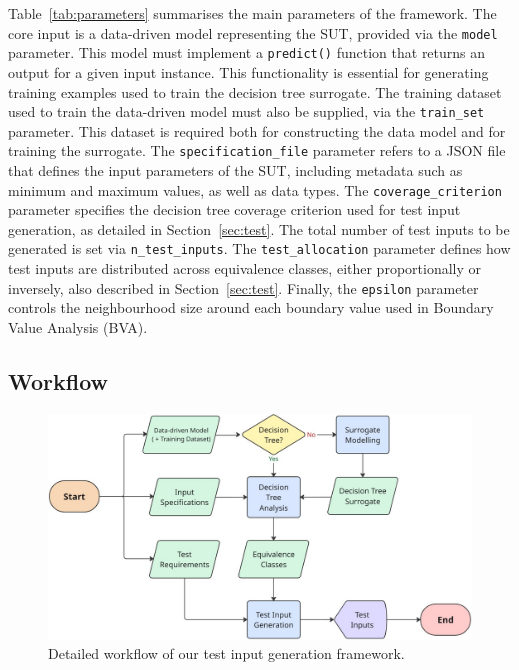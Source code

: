 \documentclass[
]{ceurart}
\theoremstyle{definition}
\begin{document}
Table~\ref{tab:parameters} summarises the main parameters of the framework. The core input is a data-driven model representing the SUT, provided via the \lstinline{model} parameter. This model must implement a \lstinline{predict()} function that returns an output for a given input instance. This functionality is essential for generating training examples used to train the decision tree surrogate. The training dataset used to train the data-driven model must also be supplied, via the \lstinline{train_set} parameter. This dataset is required both for constructing the data model and for training the surrogate. The \lstinline{specification_file} parameter refers to a JSON file that defines the input parameters of the SUT, including metadata such as minimum and maximum values, as well as data types. The \lstinline{coverage_criterion} parameter specifies the decision tree coverage criterion used for test input generation, as detailed in Section~\ref{sec:test}. The total number of test inputs to be generated is set via \lstinline{n_test_inputs}. The \lstinline{test_allocation} parameter defines how test inputs are distributed across equivalence classes, either proportionally or inversely, also described in Section~\ref{sec:test}. Finally, the \lstinline{epsilon} parameter controls the neighbourhood size around each boundary value used in Boundary Value Analysis (BVA).

\subsection{Workflow}

\begin{figure}
\centering
\includegraphics[scale=0.3]{img/workflow}
\caption{Detailed workflow of our test input generation framework.}
\label{fig:workflow}
\end{figure}
\end{document}
